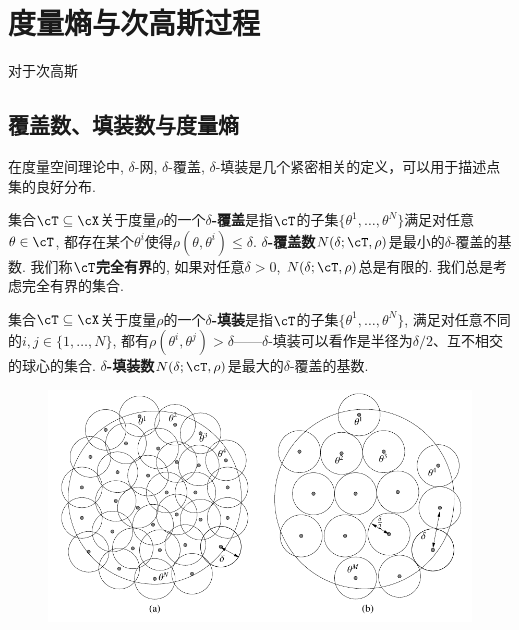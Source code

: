 \section{度量熵与次高斯过程}

对于次高斯


\subsection{覆盖数、填装数与度量熵}

在度量空间理论中, $\delta$-网,  $\delta$-覆盖, $\delta$-填装是几个紧密相关的定义，可以用于描述点集的良好分布. 

集合$\cT \subseteq \cX$关于度量$\rho$的一个\textbf{$\delta$-覆盖}是指$\cT$的子集$\{\theta^1, \dots, \theta^N\}$满足对任意$\theta \in \cT$, 都存在某个$\theta^i$使得$\rho(\theta, \theta^i) \leq \delta$. 
\textbf{$\delta$-覆盖数}$N(\delta; \cT, \rho)$是最小的$\delta$-覆盖的基数. 
我们称$\cT$\textbf{完全有界}的, 如果对任意$\delta > 0$, $N(\delta; \cT, \rho)$总是有限的. 
我们总是考虑完全有界的集合. 

集合$\cT \subseteq \cX$关于度量$\rho$的一个\textbf{$\delta$-填装}是指$\cT$的子集$\{\theta^1, \dots, \theta^N\}$, 满足对任意不同的$i, j \in \{1, \dots, N\}$, 都有$\rho(\theta^i, \theta^j) > \delta$——$\delta$-填装可以看作是半径为$\delta/2$、互不相交的球心的集合. 
\textbf{$\delta$-填装数}$N(\delta; \cT, \rho)$是最大的$\delta$-覆盖的基数. 

\begin{figure}[H]
	\centering 
	\includegraphics[width=.95\textwidth]{figure/covering-packing.pdf}
\end{figure}


